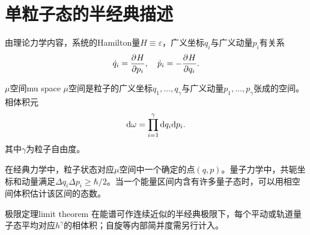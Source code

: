
\section{单粒子态的半经典描述}

由理论力学内容，系统的Hamilton量$H \equiv \varepsilon$，广义坐标$q_i$与广义动量$p_i$有关系
\[
	\dot q_i = \frac{\partial^{}H}{\partial{p_i}^{}},\quad\dot p_i = -\frac{\partial^{}H}{\partial{q_i}^{}}.
\]

\begin{definition}{$\mu$空间}{mu space}
	$\mu$空间是粒子的广义坐标$q_1,\ldots,q_\gamma$与广义动量$p_1,\ldots,p_\gamma$张成的空间。相体积元
	\begin{equation}
		\mathop{}\!\mathrm{d}\omega = \prod_{i=1}^\gamma\mathop{}\!\mathrm{d} q_i\mathrm{d} p_i.
	\end{equation}
	其中$\gamma$为粒子自由度。
\end{definition}

\begin{remark}
	在经典力学中，粒子状态对应$\mu$空间中一个确定的点$(q,p)$。量子力学中，共轭坐标和动量满足$\Delta q_i\Delta p_i \geq \hbar/2$。当一个能量区间内含有许多量子态时，可以用相空间体积估计该区间的态数。
\end{remark}

\begin{theorem}{极限定理}{limit theorem}
	在能谱可作连续近似的半经典极限下，每个平动或轨道量子态平均对应$h^\gamma$的相体积；自旋等内部简并度需另行计入。
\end{theorem}

